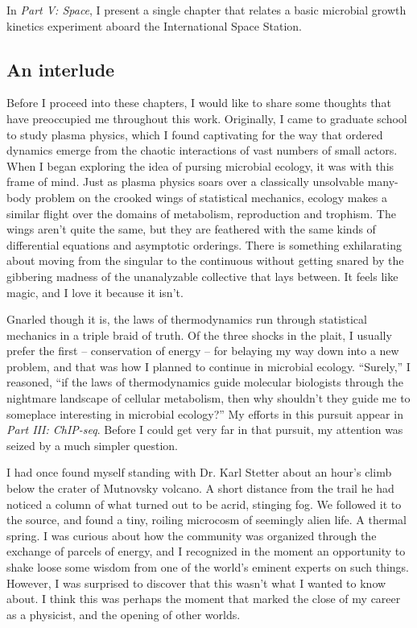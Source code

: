 In {\em Part V: Space}, I present a single chapter that relates a basic microbial growth kinetics experiment aboard the International Space Station.

\subsection*{An interlude}

Before I proceed into these chapters, I would like to share some thoughts that have preoccupied me throughout this work. Originally, I came to graduate school to study plasma physics, which I found captivating for the way that ordered dynamics emerge from the chaotic interactions of vast numbers of small actors. When I began exploring the idea of pursing microbial ecology, it was with this frame of mind. Just as plasma physics soars over a classically unsolvable many-body problem on the crooked wings of statistical mechanics, ecology makes a similar flight over the domains of metabolism, reproduction and trophism. The wings aren't quite the same, but they are feathered with the same kinds of differential equations and asymptotic orderings. There is something exhilarating about moving from the singular to the continuous without getting snared by the gibbering madness of the unanalyzable collective that lays between. It feels like magic, and I love it because it isn't.

Gnarled though it is, the laws of thermodynamics run through statistical mechanics in a triple braid of truth. Of the three shocks in the plait, I usually prefer the first -- conservation of energy -- for belaying my way down into a new problem, and that was how I planned to continue in microbial ecology. ``Surely,'' I reasoned, ``if the laws of thermodynamics guide molecular biologists through the nightmare landscape of cellular metabolism, then why shouldn't they guide me to someplace interesting in microbial ecology?'' My efforts in this pursuit appear in {\em Part III: ChIP-seq}. Before I could get very far in that pursuit, my attention was seized by a much simpler question.

I had once found myself standing with Dr. Karl Stetter about an hour's climb below the crater of Mutnovsky volcano. A short distance from the trail he had noticed a column of what turned out to be acrid, stinging fog. We followed it to the source, and found a tiny, roiling microcosm of seemingly alien life. A thermal spring. I was curious about how the community was organized through the exchange of parcels of energy, and I recognized in the moment an opportunity to shake loose some wisdom from one of the world's eminent experts on such things. However, I was surprised to discover that this wasn't what I wanted to know about. I think this was perhaps the moment that marked the close of my career as a physicist, and the opening of other worlds.

